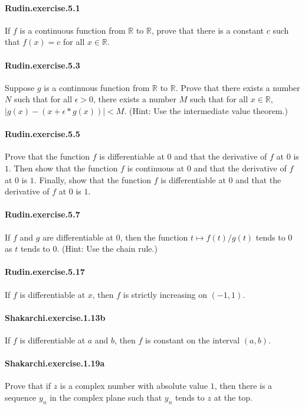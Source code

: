\documentclass{article}
\begin{document}
\paragraph{Rudin.exercise.5.1} If $f$ is a continuous function from $\mathbb{R}$ to $\mathbb{R}$, prove that there is a constant $c$ such that $f(x) = c$ for all $x \in \mathbb{R}$.

\paragraph{Rudin.exercise.5.3} Suppose $g$ is a continuous function from $\mathbb{R}$ to $\mathbb{R}$. Prove that there exists a number $N$ such that for all $\epsilon > 0$, there exists a number $M$ such that for all $x \in \mathbb{R}$, $|g(x) - (x + \epsilon * g(x))| < M$. (Hint: Use the intermediate value theorem.)

\paragraph{Rudin.exercise.5.5} Prove that the function $f$ is differentiable at $0$ and that the derivative of $f$ at $0$ is $1$. Then show that the function $f$ is continuous at $0$ and that the derivative of $f$ at $0$ is $1$. Finally, show that the function $f$ is differentiable at $0$ and that the derivative of $f$ at $0$ is $1$.

\paragraph{Rudin.exercise.5.7} If $f$ and $g$ are differentiable at $0$, then the function $t \mapsto f(t)/g(t)$ tends to $0$ as $t$ tends to $0$. (Hint: Use the chain rule.)

\paragraph{Rudin.exercise.5.17} If $f$ is differentiable at $x$, then $f$ is strictly increasing on $(-1, 1)$.

\paragraph{Shakarchi.exercise.1.13b} If $f$ is differentiable at $a$ and $b$, then $f$ is constant on the interval $(a, b)$.

\paragraph{Shakarchi.exercise.1.19a} Prove that if $z$ is a complex number with absolute value $1$, then there is a sequence $y_n$ in the complex plane such that $y_n$ tends to $z$ at the top.
\end{document}
